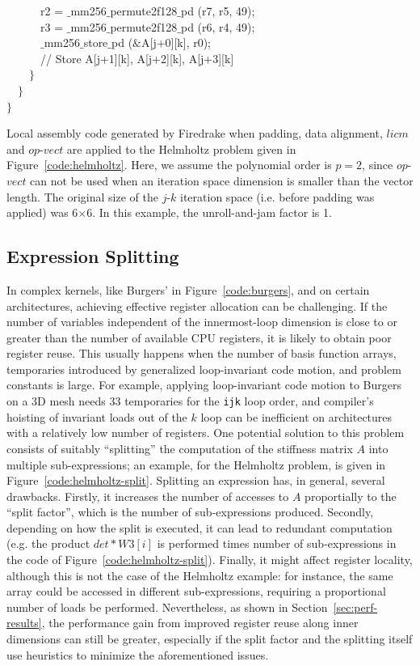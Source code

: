 \documentclass[conference]{IEEEtran}
\begin{document}
\begin{algorithm}[t]
~~~~~~r2 = $\_$mm256$\_$permute2f128$\_$pd (r7, r5, 49);\\
~~~~~~r3 = $\_$mm256$\_$permute2f128$\_$pd (r6, r4, 49);\\
~~~~~~$\_$mm256$\_$store$\_$pd ($\&$A[j+0][k], r0);\\
~~~~~~// Store A[j+1][k], A[j+2][k], A[j+3][k]\\
~~~~$\rbrace$\\
~~$\rbrace$\\
$\rbrace$
\caption{Local assembly code generated by Firedrake when padding, data alignment, $licm$ and $op$-$vect$ are applied to the Helmholtz problem given in Figure~\ref{code:helmholtz}. Here, we assume the polynomial order is $p=2$, since $op$-$vect$ can not be used when an iteration space dimension is smaller than the vector length. The original size of the $j$-$k$ iteration space (i.e. before padding was applied) was 6$\times$6. In this example, the unroll-and-jam factor is 1.}
\label{code:helmholtz-opvect}
\end{algorithm}


\subsection{Expression Splitting}
\label{sec:expr-split}
In complex kernels, like Burgers' in Figure~\ref{code:burgers}, and on certain architectures, achieving effective register allocation can be challenging. If the number of variables independent of the innermost-loop dimension is close to or greater than the number of available CPU registers, it is likely to obtain poor register reuse. This usually happens when the number of basis function arrays, temporaries introduced by generalized loop-invariant code motion, and problem constants is large. For example, applying loop-invariant code motion to Burgers on a 3D mesh needs 33 temporaries for the \texttt{ijk} loop order, and compiler's hoisting of invariant loads out of the $k$ loop can be inefficient on architectures with a relatively low number of registers. One potential solution to this problem consists of suitably ``splitting'' the computation of the stiffness matrix $A$ into multiple sub-expressions; an example, for the Helmholtz problem, is given in Figure~\ref{code:helmholtz-split}. Splitting an expression has, in general, several drawbacks. Firstly, it increases the number of accesses to $A$ proportially to the ``split factor'', which is the number of sub-expressions produced. Secondly, depending on how the split is executed, it can lead to redundant computation (e.g. the product $det*W3[i]$ is performed times number of sub-expressions in the code of Figure~\ref{code:helmholtz-split}). Finally, it might affect register locality, although this is not the case of the Helmholtz example: for instance, the same array could be accessed in different sub-expressions, requiring a proportional number of loads be performed. Nevertheless, as shown in Section~\ref{sec:perf-results}, the performance gain from improved register reuse along inner dimensions can still be greater, especially if the split factor and the splitting itself use heuristics to minimize the aforementioned issues.
\end{document}
